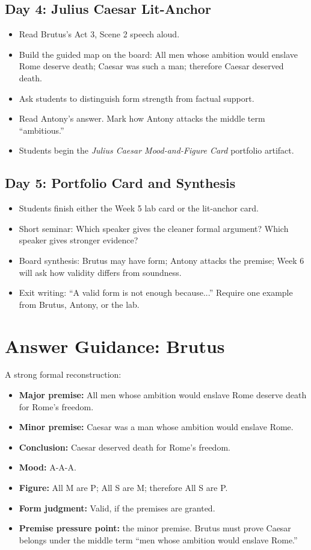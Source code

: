 \documentclass[12pt]{article}
\begin{document}
\subsection*{Day 4: Julius Caesar Lit-Anchor}
\begin{itemize}[leftmargin=*]
\item Read Brutus's Act 3, Scene 2 speech aloud.
\item Build the guided map on the board: All men whose ambition would enslave Rome deserve death; Caesar was such a man; therefore Caesar deserved death.
\item Ask students to distinguish form strength from factual support.
\item Read Antony's answer. Mark how Antony attacks the middle term ``ambitious.''
\item Students begin the \textit{Julius Caesar Mood-and-Figure Card} portfolio artifact.
\end{itemize}

\subsection*{Day 5: Portfolio Card and Synthesis}
\begin{itemize}[leftmargin=*]
\item Students finish either the Week 5 lab card or the lit-anchor card.
\item Short seminar: Which speaker gives the cleaner formal argument? Which speaker gives stronger evidence?
\item Board synthesis: Brutus may have form; Antony attacks the premise; Week 6 will ask how validity differs from soundness.
\item Exit writing: ``A valid form is not enough because...'' Require one example from Brutus, Antony, or the lab.
\end{itemize}

\section*{Answer Guidance: Brutus}
A strong formal reconstruction:
\begin{itemize}[leftmargin=*]
\item \textbf{Major premise:} All men whose ambition would enslave Rome deserve death for Rome's freedom.
\item \textbf{Minor premise:} Caesar was a man whose ambition would enslave Rome.
\item \textbf{Conclusion:} Caesar deserved death for Rome's freedom.
\item \textbf{Mood:} A-A-A.
\item \textbf{Figure:} All M are P; All S are M; therefore All S are P.
\item \textbf{Form judgment:} Valid, if the premises are granted.
\item \textbf{Premise pressure point:} the minor premise. Brutus must prove Caesar belongs under the middle term ``men whose ambition would enslave Rome.''
\end{itemize}
\end{document}
